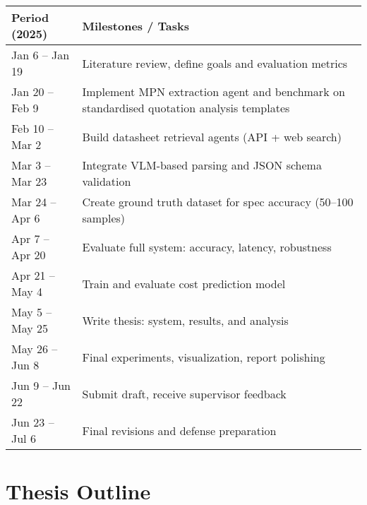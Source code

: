 \documentclass[11pt]{article}
\begin{document}
\begin{tabular}{ll}
\textbf{Period (2025)} & \textbf{Milestones / Tasks} \\
\hline
Jan 6 – Jan 19     & Literature review, define goals and evaluation metrics \\
Jan 20 – Feb 9     & Implement MPN extraction agent and benchmark on standardised quotation analysis templates \\
Feb 10 – Mar 2     & Build datasheet retrieval agents (API + web search) \\
Mar 3 – Mar 23     & Integrate VLM-based parsing and JSON schema validation \\
Mar 24 – Apr 6     & Create ground truth dataset for spec accuracy (50–100 samples) \\
Apr 7 – Apr 20     & Evaluate full system: accuracy, latency, robustness \\
Apr 21 – May 4     & Train and evaluate cost prediction model \\
May 5 – May 25     & Write thesis: system, results, and analysis \\
May 26 – Jun 8     & Final experiments, visualization, report polishing \\
Jun 9 – Jun 22     & Submit draft, receive supervisor feedback \\
Jun 23 – Jul 6     & Final revisions and defense preparation \\
\end{tabular}


\section*{Thesis Outline}
\end{document}
